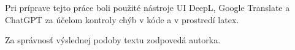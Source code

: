 \documentclass[12pt, twoside]{book}
\theoremstyle{definition}
\begin{document}
\begin{thebibliography}{99}
Pri príprave tejto práce boli použité nástroje UI DeepL, Google Translate a ChatGPT za účelom kontroly chýb v kóde a v prostredí latex. 

Za správnosť výslednej podoby textu zodpovedá autorka.






\end{thebibliography}




\newpage

%
%
\end{document}
